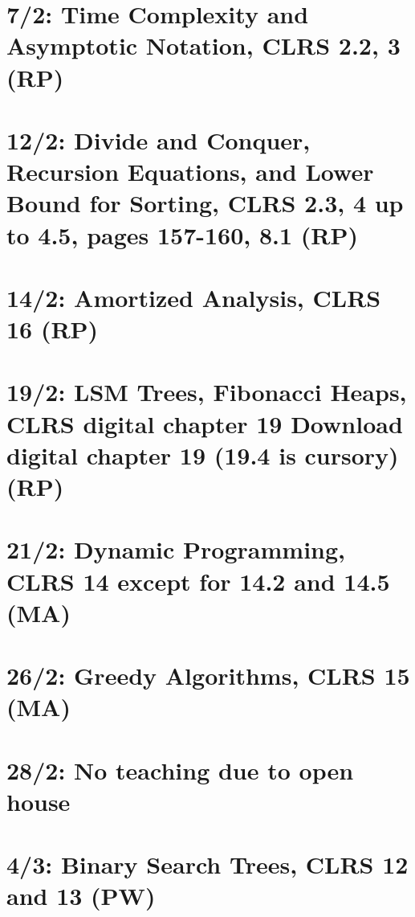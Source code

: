 
\section{7/2: Time Complexity and Asymptotic Notation, CLRS 2.2, 3 (RP)}
\section{12/2: Divide and Conquer, Recursion Equations, and Lower Bound for Sorting, CLRS 2.3, 4 up to 4.5, pages 157-160, 8.1 (RP)}
\section{14/2: Amortized Analysis, CLRS 16 (RP)}
\section{19/2: LSM Trees, Fibonacci Heaps, CLRS digital chapter 19
  Download digital chapter 19 (19.4 is cursory) (RP)}
\section{21/2: Dynamic Programming, CLRS 14 except for 14.2 and 14.5 (MA)}
\section{26/2: Greedy Algorithms, CLRS 15 (MA)}
\section{28/2: No teaching due to open house}
\section{4/3: Binary Search Trees, CLRS 12 and 13 (PW)}
